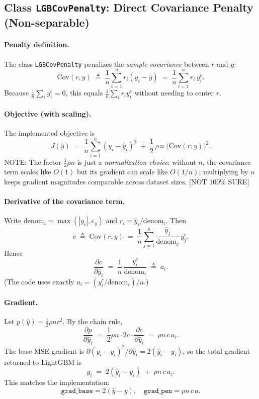 \documentclass[11pt]{article}
\theoremstyle{plain}
\theoremstyle{definition}
\newcommand{\1}{\mathbf{1}}
\begin{document}
\subsection{Class \texttt{LGBCovPenalty}: Direct Covariance Penalty (Non-separable)}
\label{subsec:lgb_cov_penalty}

\paragraph{Penalty definition.}
The class \texttt{LGBCovPenalty} penalizes the \emph{sample covariance} between $r$ and $y$:
\[
\mathrm{Cov}(r,y)
\;\triangleq\;
\frac{1}{n}\sum_{i=1}^n r_i(y_i-\bar y)
\;=\;
\frac{1}{n}\sum_{i=1}^n r_i\,y_i^c.
\]
Because $\frac{1}{n}\sum_i y_i^c = 0$, this equals $\frac{1}{n}\sum_i r_i y_i^c$ without needing to center $r$.

\paragraph{Objective (with scaling).}
The implemented objective is
\begin{equation}
\label{eq:cov_obj}
J(\hat y)
\;=\;
\frac{1}{n}\sum_{i=1}^n (y_i-\hat y_i)^2
\;+\;
\frac{1}{2}\,\rho\,n\;\Big(\mathrm{Cov}(r,y)\Big)^2.
\end{equation}
{\color{red} NOTE: The factor $\frac{1}{2}\rho n$ is just a \emph{normalization choice}: without $n$, the covariance term scales like $O(1)$ but its gradient can scale like $O(1/n)$; multiplying by $n$ keeps gradient magnitudes comparable across dataset sizes. [NOT 100\% SURE]}

\paragraph{Derivative of the covariance term.}
Write $\mathrm{denom}_i=\max(|y_i|,\varepsilon_y)$ and $r_i=\hat y_i/\mathrm{denom}_i$. Then
\[
c \;\triangleq\; \mathrm{Cov}(r,y) \;=\; \frac{1}{n}\sum_{j=1}^n \frac{\hat y_j}{\mathrm{denom}_j}\,y_j^c.
\]
Hence
\[
\frac{\partial c}{\partial \hat y_i}
\;=\;
\frac{1}{n}\,\frac{y_i^c}{\mathrm{denom}_i}
\;\triangleq\;
a_i.
\]
(The code uses exactly $a_i = (y_i^c/\mathrm{denom}_i)/n$.)

\paragraph{Gradient.}
Let $p(\hat y)=\frac{1}{2}\rho n c^2$. By the chain rule,
\[
\frac{\partial p}{\partial \hat y_i}
\;=\;
\frac{1}{2}\rho n\cdot 2c\cdot \frac{\partial c}{\partial \hat y_i}
\;=\;
\rho n\,c\,a_i.
\]
The base MSE gradient is $\partial (y_i-\hat y_i)^2/\partial \hat y_i = 2(\hat y_i-y_i)$, so the total gradient returned to LightGBM is
\begin{equation}
\label{eq:cov_grad}
g_i
\;=\;
2(\hat y_i-y_i)
\;+\;
\rho n\,c\,a_i.
\end{equation}
This matches the implementation:
\[
\texttt{grad\_base}=2(\hat y-y),\quad
\texttt{grad\_pen}=\rho n\,c\,a.
\]
\end{document}
